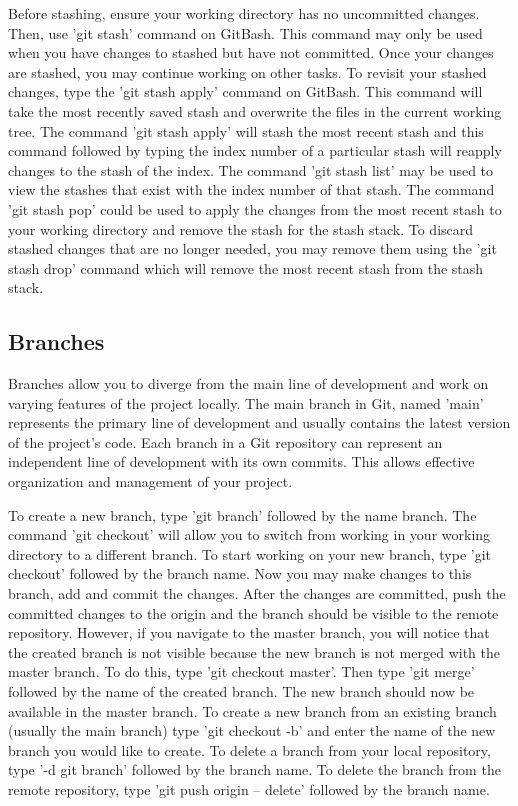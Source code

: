 \documentclass[10pt,twocolumn]{article}
\begin{document}
Before stashing, ensure your working directory has no uncommitted changes. Then, use 'git stash' command on GitBash. This command may only be used when you have changes to stashed but have not committed. Once your changes are stashed, you may continue working on other tasks. To revisit your stashed changes, type the 'git stash apply' command on GitBash. This command will take the most recently saved stash and overwrite the files in the current working tree.   The command 'git stash apply' will stash the most recent stash and this command followed by typing the index number of a particular stash will reapply changes to the stash of the index. The command 'git stash list' may be used to view the stashes that exist with the index number of that stash. The command 'git stash pop' could be used to apply the changes from the most recent stash to your working directory and remove the stash for the stash stack. To discard stashed changes that are no longer needed, you may remove them using the 'git stash drop' command which will remove the most recent stash from the stash stack. 

\subsection {Branches}
Branches allow you to diverge from the main line of development and work on varying features of the project locally. The main branch in Git, named 'main' represents the primary line of development and usually contains the latest version of the project's code.  Each branch in a Git repository can represent an independent line of development with its own commits. This allows effective organization and management of your project.

To create a new branch, type 'git branch' followed by the name branch. The command 'git checkout' will allow you to switch from working in your working directory to a different branch. To start working on your new branch, type 'git checkout' followed by the branch name. Now you may make changes to this branch, add and commit the changes. After the changes are committed, push the committed changes to the origin and the branch should be visible to the remote repository. However, if you navigate to the master branch, you will notice that the created branch is not visible because the new branch is not merged with the master branch. To do this, type 'git checkout master'. Then type  'git merge' followed by the name of the created branch. The new branch should now be available in the master branch.  To create a new branch from an existing branch (usually the main branch) type 'git checkout -b' and enter the name of the new branch you would like to create.  To delete a branch from your local repository, type '-d git branch' followed by the branch name. To delete the branch from the remote repository, type 'git push origin -- delete' followed by the branch name. 
\end{document}
